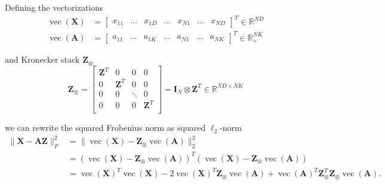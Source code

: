 \documentclass[oneside]{article}
\begin{document}
Defining the vectorizations
\begin{equation}
    \begin{aligned}
        \operatorname{vec}(\mathbf{X}) &= \begin{bmatrix} x_{11} & ... & x_{1D} & ... & x_{N1} & ... & x_{ND} \end{bmatrix}^T \in \mathbb{R}^{ND} \\
        \operatorname{vec}(\mathbf{A}) &= \begin{bmatrix} a_{11} & ... & a_{1K} & ... & a_{N1} & ... & a_{NK} \end{bmatrix}^T \in \mathbb{R}_+^{NK}
    \end{aligned}
\end{equation}

and Kronecker stack $\mathbf{Z}_{\otimes}$
\begin{equation}
    \mathbf{Z}_{\otimes} =
        \begin{bmatrix}
            \mathbf{Z}^T & 0 & 0 & 0 \\
            0 & \mathbf{Z}^T & 0 & 0 \\
            0 & 0 & \ddots & 0 \\
            0 & 0 & 0 & \mathbf{Z}^T \\
        \end{bmatrix} = \mathbf{I}_N \otimes \mathbf{Z}^T \in \mathbb{R}^{ND \times NK}
\end{equation}

we can rewrite the squared Frobenius norm as squared $\ell_2$-norm\begin{equation}
    \begin{aligned}
        \| \mathbf{X} - \mathbf{A} \mathbf{Z} \|_F^2
        &= \bigl\|
            \operatorname{vec}(\mathbf{X}) - \mathbf{Z}_{\otimes} \operatorname{vec}(\mathbf{A})
        \bigr\|_2^{2} \\
        &= \left( \operatorname{vec}(\mathbf{X}) - \mathbf{Z}_{\otimes} \operatorname{vec}(\mathbf{A}) \right)^T
        \left( \operatorname{vec}(\mathbf{X}) - \mathbf{Z}_{\otimes} \operatorname{vec}(\mathbf{A}) \right) \\
        &=  \operatorname{vec}(\mathbf{X})^T  \operatorname{vec}(\mathbf{X})
        - 2 \operatorname{vec}(\mathbf{X})^T \mathbf{Z}_{\otimes} \operatorname{vec}(\mathbf{A})
        + \operatorname{vec}(\mathbf{A})^T \mathbf{Z}_{\otimes}^T \mathbf{Z}_{\otimes} \operatorname{vec}(\mathbf{A}).
    \end{aligned}
\end{equation}
\end{document}
